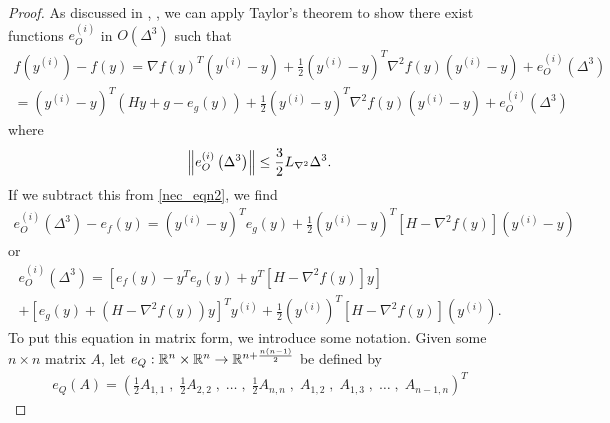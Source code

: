 \begin{proof}
As discussed in \cite{introduction_book}, \cite[Lemma 4.1.14]{dennisschnabel1983},
we can apply Taylor's theorem to show there exist functions $e^{(i)}_O$ in $O\left(\Delta^3\right)$ such that
\begin{align*}
f\left(y^{(i)}\right) - f(y)
= \nabla f(y)^T \left(y^{(i)} - y\right) + \frac 1 2 \left(y^{(i)} - y\right)^T \nabla^2 f(y) \left(y^{(i)} - y\right) + e^{(i)}_O\left(\Delta^3\right) \\
= \left(y^{(i)} - y\right)^T \left(Hy + g - e_g(y)\right) + \frac 1 2 \left(y^{(i)} - y\right)^T \nabla^2 f(y) \left(y^{(i)} - y\right) + e^{(i)}_O\left(\Delta^3\right)
\end{align*}
where
\begin{align}
\left\|e^{(i)}_O\left(\Delta^3\right) \right\| \le \frac 3 2 {L_{\nabla^2}} \Delta^3 \label{nce_bound_rhs}.
\end{align}
If we subtract this from \cref{nec_eqn2}, we find
\begin{align*}
e^{(i)}_O\left(\Delta^3\right) - e_f(y) = \left(y^{(i)} - y\right)^Te_g(y) +
\frac 1 2 \left(y^{(i)} - y\right)^T \left[H - \nabla^2 f(y)\right]\left(y^{(i)} - y\right)
\end{align*}
or
\begin{align}
e^{(i)}_O\left(\Delta^3\right) = \left[e_f(y) - y^T e_g(y) + y^T \left[H - \nabla^2f(y)\right]y \right] \nonumber \\
+ \left[e_g(y) + \left(H - \nabla^2 f(y)\right)y\right]^T y^{(i)}
+ \frac 1 2 \left(y^{(i)}\right)^T \left[H - \nabla^2 f(y)\right]\left(y^{(i)}\right).
\label{nec_eqn1}
\end{align}
To put this equation in matrix form, we introduce some notation.
Given some $n \times n$ matrix $A$, let $e_Q : \mathbb R^n \times \mathbb R^n \to \mathbb R^{n + \frac {n(n-1)} 2}$
be defined by
\begin{align*}
e_Q\left(A\right) =
\left(\frac 1 2 A_{1, 1} \;,\; \frac 1 2 A_{2, 2} \;,\; \ldots \;,\; \frac 1 2 A_{n, n} \;,\; A_{1, 2} \;,\; A_{1, 3} \;,\; \ldots \;,\; A_{n-1, n} \right)^T

\end{align*}
\end{proof}
